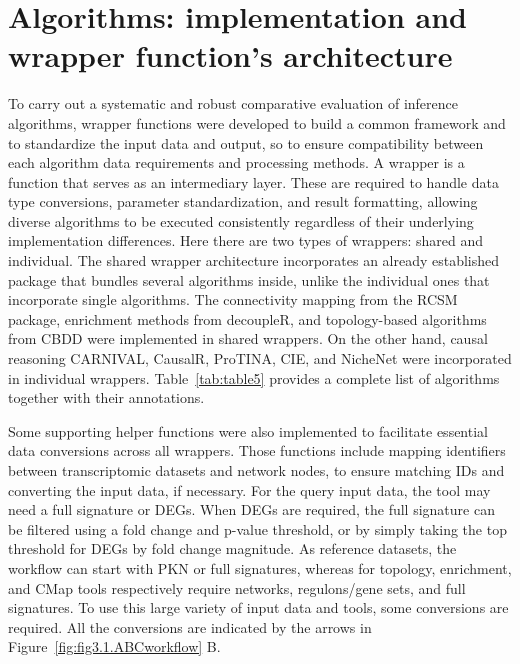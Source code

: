 \section{Algorithms: implementation and wrapper function's architecture} %
\label{sec:algorithms}

To carry out a systematic and robust comparative evaluation of inference algorithms, wrapper functions were developed to build a common framework and to standardize the input data and output, so to ensure compatibility between each algorithm data requirements and processing methods. 
A wrapper is a function that serves as an intermediary layer. 
These are required to handle data type conversions, parameter standardization, and result formatting, allowing diverse algorithms to be executed consistently regardless of their underlying implementation differences.
Here there are two types of wrappers: shared and individual. The shared wrapper architecture incorporates an already established package that bundles several algorithms inside, unlike the individual ones that incorporate single algorithms. The connectivity mapping from the \gls{RCSM} package, enrichment methods from decoupleR, and topology-based algorithms from \gls{CBDD} were implemented in shared wrappers. On the other hand, causal reasoning \gls{CARNIVAL}, CausalR, \gls{ProTINA}, \gls{CIE}, and NicheNet were incorporated in individual wrappers. Table~\ref{tab:table5} provides a complete list of algorithms together with their annotations.

Some supporting helper functions were also implemented to facilitate essential data conversions across all wrappers. Those functions include mapping identifiers between transcriptomic datasets and network nodes, to ensure matching IDs and converting the input data, if necessary. For the query input data, the tool may need a full signature or \gls{DEGs}. When \gls{DEGs} are required, the full signature can be filtered using a fold change and p-value threshold, or by simply taking the top threshold for \gls{DEGs} by fold change magnitude. As reference datasets, the workflow can start with PKN or full signatures, whereas for topology, enrichment, and \gls{CMap} tools respectively require networks, regulons/gene sets, and full signatures. To use this large variety of input data and tools, some conversions are required. All the conversions are indicated by the arrows in Figure~\ref{fig:fig3.1.ABCworkflow} B. 

